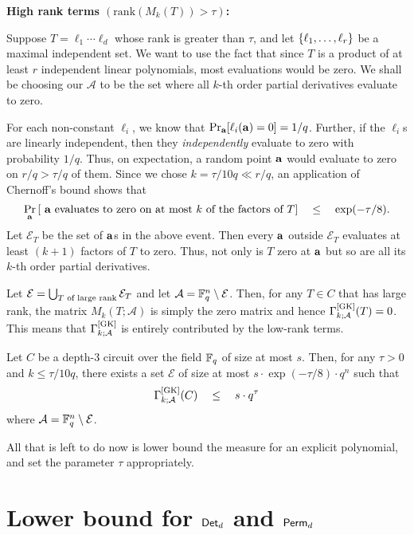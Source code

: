\noindent
{\bf High rank terms $(\mathrm{rank}(M_{k}(T)) > \tau)$:}

Suppose $T = \ell_1\cdots \ell_d$ whose rank is greater than $\tau$, and let $\left\{\ell_1, \dots, \ell_r\right\}$ be a maximal
independent set. 
We want to use the fact that since $T$ is a product
of at least $r$ independent linear polynomials, most evaluations would
be zero. 
We shall be choosing our $\mathcal{A}$ to be the set where
all $k$-th order partial derivatives evaluate to zero.

For each non-constant $\ell_i$, we know that $\Pr_{\mathbf{a}} [\ell_i(\mathbf{a}) = 0]  =  1/q$. 
Further, if the $\ell_i$s are linearly independent, then they \emph{independently} evaluate to zero with probability $1/q$. 
Thus, on expectation, a random point $\mathbf{a}$ would evaluate to zero on $r/q > \tau/q$ of them. 
Since we chose $k = \tau/10q \ll r/q$, an application of Chernoff's bound shows that 
\[
\Pr_{\mathbf{a}}\left[\text{ $\mathbf{a}$ evaluates to zero on at most $k$ of the factors of $T$}\right] \quad \leq \quad \exp(-\tau/8).
\]
Let $\mathcal{E}_T$ be the set of $\mathbf{a}$s in the above event. Then every $\mathbf{a}$ outside $\mathcal{E}_T$ evaluates at least $(k+1)$ factors of $T$ to zero. 
Thus, not only is $T$ zero at $\mathbf{a}$ but so are all its $k$-th order partial derivatives. 

Let $\mathcal{E}  = \bigcup_{T\text{ of large rank}} \mathcal{E}_T$ and let $\mathcal{A} = \mathbb{F}_q^n \setminus \mathcal{E}$. 
Then, for any $T\in C$ that has large rank, the matrix $M_k(T;\mathcal{A})$ is simply the zero matrix and hence $\Gamma^{\mathrm{[GK]}}_{k;\mathcal{A}}(T) = 0$. 
This means that $\Gamma^{\mathrm{[GK]}}_{k;\mathcal{A}}$ is entirely contributed by the low-rank terms. 

\begin{lemma}\label{lem:GK-upper-bound}
Let $C$ be a depth-$3$ circuit over the field $\mathbb{F}_q$ of size at most $s$. Then, for any $\tau > 0$ and $k \leq \tau/10q$, there exists a set $\mathcal{E}$ of size at most $s \cdot \exp(-\tau/8) \cdot q^n$ such that 
\[
\Gamma^{\mathrm{[GK]}}_{k;\mathcal{A}}(C) \quad \leq \quad s \cdot q^{\tau}
\]
where $\mathcal{A} = \mathbb{F}_q^n \setminus \mathcal{E}$. 
\end{lemma}

All that is left to do now is lower bound the measure for an explicit polynomial, and set the parameter $\tau$ appropriately.

\section{Lower bound for $\operatorname{\mathsf{Det}}_d$ and $\operatorname{\mathsf{Perm}}_d$}

